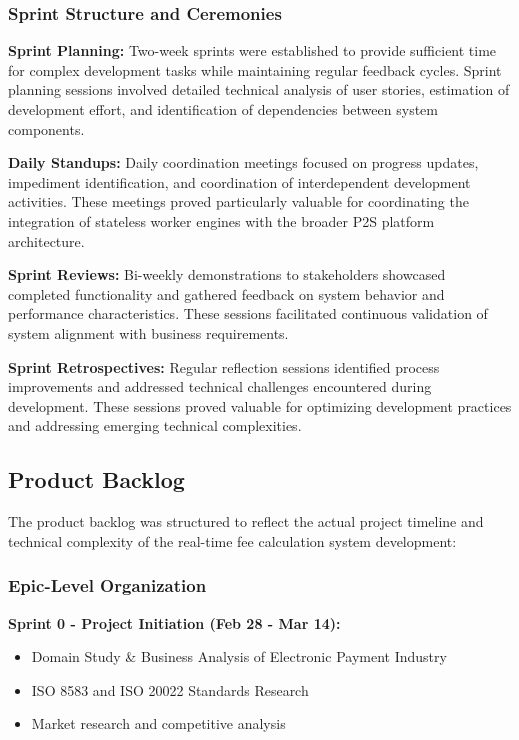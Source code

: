 \subsubsection{Sprint Structure and Ceremonies}

\textbf{Sprint Planning:} Two-week sprints were established to provide sufficient time for complex development tasks while maintaining regular feedback cycles. Sprint planning sessions involved detailed technical analysis of user stories, estimation of development effort, and identification of dependencies between system components.

\textbf{Daily Standups:} Daily coordination meetings focused on progress updates, impediment identification, and coordination of interdependent development activities. These meetings proved particularly valuable for coordinating the integration of stateless worker engines with the broader P2S platform architecture.

\textbf{Sprint Reviews:} Bi-weekly demonstrations to stakeholders showcased completed functionality and gathered feedback on system behavior and performance characteristics. These sessions facilitated continuous validation of system alignment with business requirements.

\textbf{Sprint Retrospectives:} Regular reflection sessions identified process improvements and addressed technical challenges encountered during development. These sessions proved valuable for optimizing development practices and addressing emerging technical complexities.

\subsection{Product Backlog}

The product backlog was structured to reflect the actual project timeline and technical complexity of the real-time fee calculation system development:

\subsubsection{Epic-Level Organization}

\textbf{Sprint 0 - Project Initiation (Feb 28 - Mar 14):}
\begin{itemize}
    \item Domain Study \& Business Analysis of Electronic Payment Industry
    \item ISO 8583 and ISO 20022 Standards Research
    \item Market research and competitive analysis
\end{itemize}

